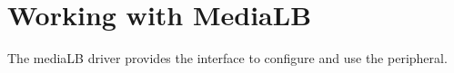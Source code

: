 \hypertarget{group__mediaLB}{}\section{Working with Media\+LB}
\label{group__mediaLB}
The media\+LB driver provides the interface to configure and use the peripheral. 